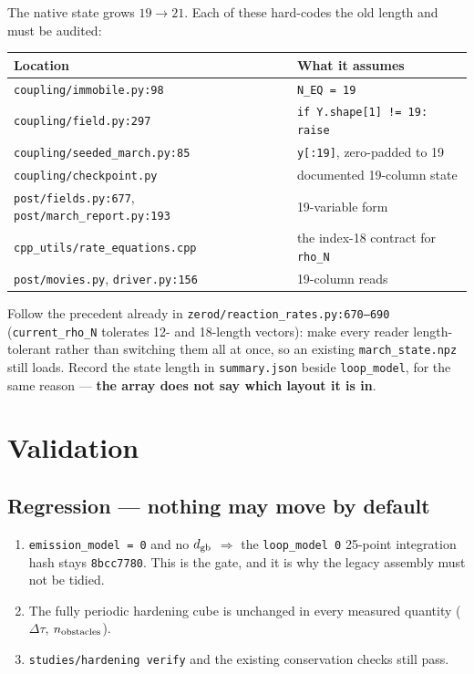 \documentclass[11pt]{article}
\newcommand{\fbk}{\discretionary{}{}{}}   %
\newcommand{\file}[1]{\texttt{\small #1}}
\begin{document}
The native state grows $19\to21$.  Each of these hard-codes the old length and
must be audited:

\begin{center}\small
\begin{tabular}{@{}p{}p{}@{}}
\toprule
\textbf{Location} & \textbf{What it assumes}\\
\midrule
\file{coupling/\fbk immobile.\fbk py:98} & \verb|N_EQ = 19|\\
\file{coupling/\fbk field.\fbk py:297} & \verb|if Y.shape[1] != 19: raise|\\
\file{coupling/\fbk seeded\_\fbk march.\fbk py:85} & \verb|y[:19]|,
  zero-padded to 19\\
\file{coupling/\fbk checkpoint.\fbk py} & documented 19-column state\\
\file{post/\fbk fields.\fbk py:677},
\file{post/\fbk march\_\fbk report.\fbk py:193} & 19-variable form\\
\file{cpp\_\fbk utils/\fbk rate\_\fbk equations.\fbk cpp} & the index-18
  contract for \verb|rho_N|\\
\file{post/\fbk movies.\fbk py}, \file{driver.\fbk py:156} & 19-column reads\\
\bottomrule
\end{tabular}
\end{center}

Follow the precedent already in
\file{zerod/\fbk reaction\_\fbk rates.\fbk py:670--690}
(\verb|current_rho_N| tolerates 12- and 18-length vectors): make every reader
length-tolerant rather than switching them all at once, so an existing
\file{march\_\fbk state.\fbk npz} still loads.  Record the state length in
\file{summary.\fbk json} beside \verb|loop_model|, for the same reason ---
\textbf{the array does not say which layout it is in}.

\section{Validation}
\label{sec:validation}

\subsection{Regression --- nothing may move by default}
\begin{enumerate}
\item \verb|emission_model = 0| and no $d_{\rm gb}$ $\Rightarrow$ the
  \verb|loop_model 0| 25-point integration hash stays \verb|8bcc7780|.  This
  is the gate, and it is why the legacy assembly must not be tidied.
\item The fully periodic hardening cube is unchanged in every measured
  quantity ($\Delta\tau$, $n_{\rm obstacles}$).
\item \verb|studies/hardening verify| and the existing conservation checks
  still pass.
\end{enumerate}
\end{document}
